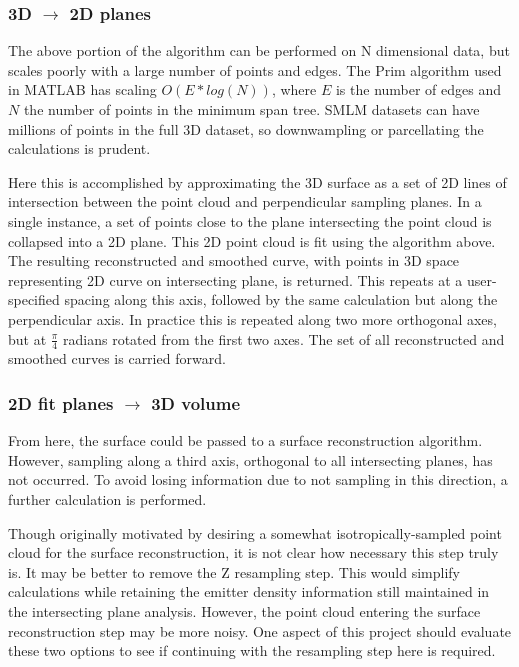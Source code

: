 \documentclass[10pt,a4paper]{article}
\begin{document}
\subsubsection{3D $\rightarrow$ 2D planes}

The above portion of the algorithm can be performed on N dimensional data, but scales poorly with a large number of points and edges.  The Prim algorithm used in MATLAB has scaling $O(E*log(N))$, where $E$ is the number of edges and $N$ the number of points in the minimum span tree.  SMLM datasets can have millions of points in the full 3D dataset, so downwampling or parcellating the calculations is prudent. 

Here this is accomplished by approximating the 3D surface as a set of 2D lines of intersection between the point cloud and perpendicular sampling planes.  In a single instance, a set of points close to the plane intersecting the point cloud is collapsed into a 2D plane.  This 2D point cloud is fit using the algorithm above.  The resulting reconstructed and smoothed curve, with points in 3D space representing 2D curve on intersecting plane, is returned.  This repeats at a user-specified spacing along this axis, followed by the same calculation but along the perpendicular axis.  In practice this is repeated along two more orthogonal axes, but at $\frac{\pi}{4}$ radians rotated from the first two axes.  The set of all reconstructed and smoothed curves is carried forward. 

\subsubsection{2D fit planes $\rightarrow$ 3D volume}

From here, the surface could be passed to a surface reconstruction algorithm.  However, sampling along a third axis, orthogonal to all intersecting planes, has not occurred.  To avoid losing information due to not sampling in this direction, a further calculation is performed. 

Though originally motivated by desiring a somewhat isotropically-sampled point cloud for the surface reconstruction, it is not clear how necessary this step truly is.  It may be better to remove the Z resampling step.  This would simplify calculations while retaining the emitter density information still maintained in the intersecting plane analysis.  However, the point cloud entering the surface reconstruction step may be more noisy.  One aspect of this project should evaluate these two options to see if continuing with the resampling step here is required.  
\end{document}
